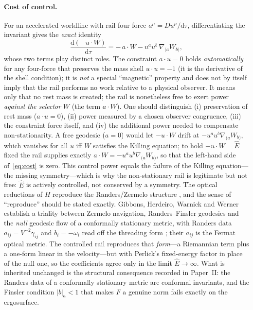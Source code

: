 \documentclass[12pt]{iopart}
\newcommand{\Ehat}{\hat E}
\newcommand{\dd}{\mathrm{d}}
\theoremstyle{plain}
\theoremstyle{definition}
\theoremstyle{plain}
\theoremstyle{remark}
\begin{document}
\paragraph{Cost of control.} For an accelerated worldline with rail four-force
$a^\mu=Du^\mu/\dd\tau$, differentiating the invariant gives the \emph{exact}
identity
\begin{equation}
    \frac{\dd(-u\cdot W)}{\dd\tau}=-\,a\cdot W-u^a u^b\,\nabla_{(a}W_{b)},
    \label{eq:cost}
\end{equation}
whose two terms play distinct roles. The constraint $a\cdot u=0$ holds
\emph{automatically} for any four-force that preserves the mass shell
$u\cdot u=-1$ (it is the derivative of the shell condition); it is \emph{not} a
special ``magnetic'' property and does not by itself imply that the rail performs no
work relative to a physical observer. It means only that no rest mass is created;
the rail is nonetheless free to exert power \emph{against the selector} $W$ (the term
$a\cdot W$). One should distinguish (i) preservation of rest mass ($a\cdot u=0$),
(ii) power measured by a chosen observer congruence, (iii) the constraint force
itself, and (iv) the additional power needed to compensate non-stationarity.
A free geodesic ($a=0$) would let $-u\cdot W$ drift at $-u^au^b\nabla_{(a}W_{b)}$,
which vanishes for all $u$ iff $W$ satisfies the Killing equation; to hold
$-u\cdot W=\Ehat$ fixed the rail supplies exactly $a\cdot W=-u^au^b\nabla_{(a}W_{b)}$,
so that the left-hand side of~\eqref{eq:cost} is zero. This control power equals the
failure of the Killing equation---the missing symmetry---which is why the
non-stationary rail is legitimate but not free: $\Ehat$ is actively controlled, not
conserved by a symmetry. The optical reductions of $H$
reproduce the Randers/Zermelo structure
\cite{GibbonsRanders2009,CaponioWind}, and the sense of ``reproduce'' should be
stated exactly. Gibbons, Herdeiro, Warnick and Werner establish a triality between
Zermelo navigation, Randers--Finsler geodesics and the \emph{null} geodesic flow of
a conformally stationary metric, with Randers data $a_{ij}=V^{-2}\gamma_{ij}$ and
$b_i=-\omega_i$ read off the threading form
\cite[Eqs.~(19)--(23)]{GibbonsRanders2009}; their $a_{ij}$ is the Fermat optical
metric. The controlled rail reproduces that \emph{form}---a Riemannian term plus a
one-form linear in the velocity---but with Perlick's fixed-energy factor in place of
the null one, so the coefficients agree only in the limit $\Ehat\to\infty$. What is
inherited unchanged is the structural consequence recorded in
Paper~II: the Randers data of a conformally stationary metric are conformal
invariants, and the Finsler condition $|b|_a<1$ that makes $F$ a genuine norm fails
exactly on the ergosurface.
\end{document}
